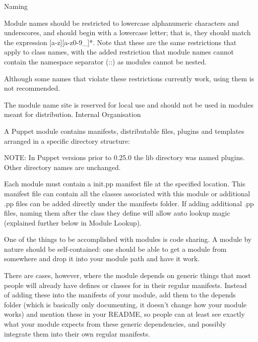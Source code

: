 Naming

Module names should be restricted to lowercase alphanumeric characters and underscores, and should begin with a lowercase letter; that is, they should match the expression [a-z][a-z0-9\_]*. Note that these are the same restrictions that apply to class names, with the added restriction that module names cannot contain the namespace separator (::) as modules cannot be nested.

Although some names that violate these restrictions currently work, using them is not recommended.

The module name site is reserved for local use and should not be used in modules meant for distribution.
Internal Organisation

A Puppet module contains manifests, distributable files, plugins and templates arranged in a specific directory structure:


NOTE: In Puppet versions prior to 0.25.0 the lib directory was named plugins. Other directory names are unchanged.

Each module must contain a init.pp manifest file at the specified location. This manifest file can contain all the classes associated with this module or additional .pp files can be added directly under the manifests folder. If adding additional .pp files, naming them after the class they define will allow auto lookup magic (explained further below in Module Lookup).

One of the things to be accomplished with modules is code sharing. A module by nature should be self-contained: one should be able to get a module from somewhere and drop it into your module path and have it work.

There are cases, however, where the module depends on generic things that most people will already have defines or classes for in their regular manifests. Instead of adding these into the manifests of your module, add them to the depends folder (which is basically only documenting, it doesn't change how your module works) and mention these in your README, so people can at least see exactly what your module expects from these generic dependencies, and possibly integrate them into their own regular manifests.

